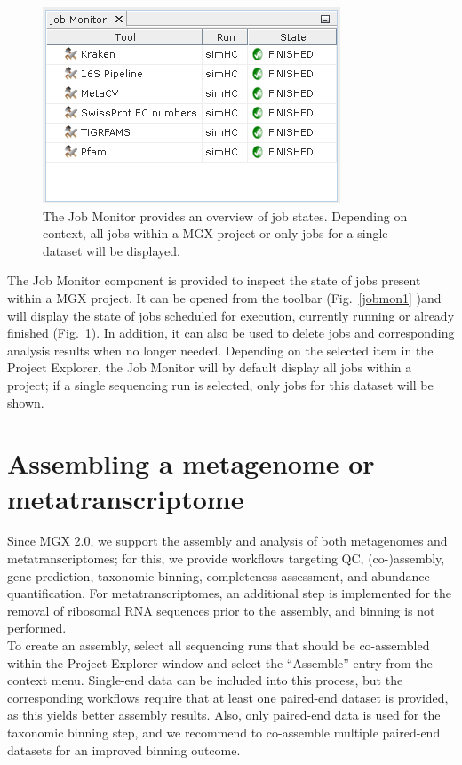 \begin{figure}[H]
\centering
\includegraphics[width=.6\textwidth]{img/mgx/JobMon}
\caption[Job monitor]{The Job Monitor provides an overview of job states. Depending on context, all jobs
within a MGX project or only jobs for a single dataset will be displayed.}
\label{jobmon2}
\end{figure}

The Job Monitor component is provided to inspect the state of jobs present within a MGX project.
It can be opened from the toolbar (Fig.~\ref{jobmon1} )and will display the state of jobs scheduled for execution,
currently running or already finished (Fig.~\ref{jobmon2}). In addition, it can also be used to delete jobs and
corresponding analysis results when no longer needed. Depending on the selected item in the
Project Explorer, the Job Monitor will by default display all jobs within a project; if a single
sequencing run is selected, only jobs for this dataset will be shown.

\section{Assembling a metagenome or metatranscriptome}

Since MGX 2.0, we support the assembly and analysis of both metagenomes and metatranscriptomes; for this, we
provide workflows targeting QC, (co-)assembly, gene prediction, taxonomic binning, completeness assessment, and
abundance quantification. For metatranscriptomes, an additional step is implemented for the removal of ribosomal
RNA sequences prior to the assembly, and binning is not performed.\\

\noindent
To create an assembly, select all sequencing runs that should be co-assembled within the Project Explorer window
and select the ``Assemble'' entry from the context menu. Single-end data can be included into this process, but
the corresponding workflows require that at least one paired-end dataset is provided, as this yields better assembly
results. Also, only paired-end data is used for the taxonomic binning step, and we recommend to co-assemble multiple 
paired-end datasets for an improved binning outcome.\\

